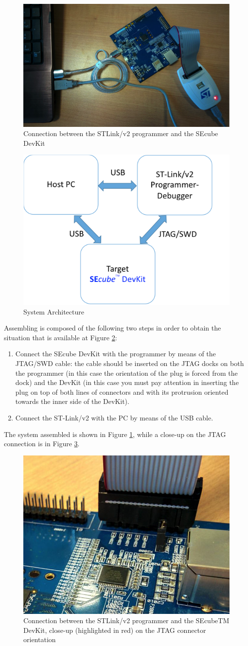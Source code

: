 \begin{figure}[H]
	\centering
	\includegraphics[width=0.42\linewidth]{images/firmware/setup_2}
	\caption{Connection between the STLink/v2 programmer and the SEcube DevKit}
	\label{fig:setup2}
\end{figure}

\begin{figure}
	\centering
	\includegraphics[width=0.35\linewidth]{images/firmware/setup_4}
	\caption{System Architecture}
	\label{fig:setup4}
\end{figure}


Assembling is composed of the following two steps in order to obtain the situation that is available at Figure \ref{fig:setup4}:
\begin{enumerate}
	\item Connect the SEcube DevKit with the programmer by means of the JTAG/SWD cable: the
	cable should be inserted on the JTAG docks on both the programmer (in this case the orientation of the plug is forced from the dock) and the DevKit (in this case you must pay
	attention in inserting the plug on top of both lines of connectors and with its protrusion
	oriented towards the inner side of the DevKit).
	\item Connect the ST-Link/v2 with the PC by means of the USB cable.
\end{enumerate}
The system assembled is shown in Figure \ref{fig:setup2}, while a close-up on the JTAG connection is in Figure \ref{fig:setup3}.

\begin{figure}
	\centering
	\includegraphics[width=0.35\linewidth]{images/firmware/setup_3}
	\caption{Connection between the STLink/v2 programmer and the SEcubeTM DevKit, close-up (highlighted in red) on the JTAG connector orientation}
	\label{fig:setup3}
\end{figure}


